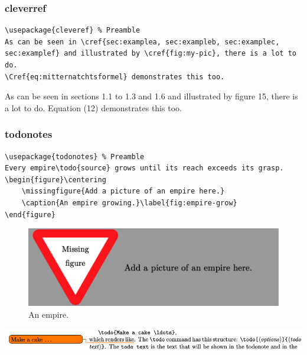 \documentclass[handout]{beamer}
\begin{document}
\begin{frame}[fragile]
    \frametitle{cleverref}
    \begin{lstlisting}
\usepackage{cleveref} % Preamble
As can be seen in \cref{sec:examplea, sec:exampleb, sec:examplec, sec:examplef} and illustrated by \cref{fig:my-pic}, there is a lot to do.
\Cref{eq:mitternatchtsformel} demonstrates this too.
    \end{lstlisting}

    As can be seen in sections 1.1 to 1.3 and 1.6 and illustrated by figure 15, there is a lot to do.
    Equation (12) demonstrates this too.
\end{frame}

\begin{frame}[fragile]
    \frametitle{todonotes}
    \begin{lstlisting}[basicstyle=\ttfamily\footnotesize]
\usepackage{todonotes} % Preamble
Every empire\todo{source} grows until its reach exceeds its grasp.
\begin{figure}\centering
    \missingfigure{Add a picture of an empire here.}
    \caption{An empire growing.}\label{fig:empire-grow}
\end{figure}
    \end{lstlisting}

    \begin{figure}
        \centering\small
        \includegraphics[width=\linewidth]{images/missfig.png}
        \caption{An empire.}
        \label{fig:empire-grow}
    \end{figure}

    \includegraphics[width=\linewidth]{images/todo}
\end{frame}
\end{document}
